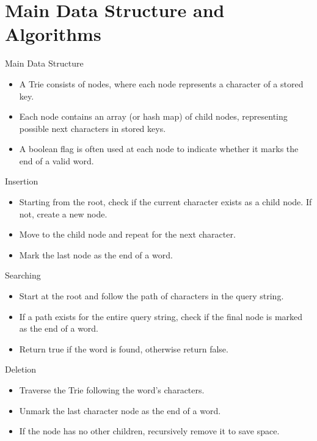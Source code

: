 \section{Main Data Structure and Algorithms}

\begin{frame}{Main Data Structure}
    \begin{itemize}[label=$\star$]
    \item A Trie consists of nodes, where each node represents a character of a stored key.
    \item Each node contains an array (or hash map) of child nodes, representing possible next characters in stored keys.
    \item A boolean flag is often used at each node to indicate whether it marks the end of a valid word.
\end{itemize}
\end{frame}

\begin{frame}{Insertion}
    \begin{itemize}[label=$\star$]
    \item Starting from the root, check if the current character exists as a child node. If not, create a new node. 
    \item Move to the child node and repeat for the next character.
    \item Mark the last node as the end of a word.
\end{itemize}
\end{frame}
\begin{frame}{Searching}
    \begin{itemize}[label=$\star$]
    \item Start at the root and follow the path of characters in the query string.
    \item If a path exists for the entire query string, check if the final node is marked as the end of a word.
    \item Return true if the word is found, otherwise return false.
\end{itemize}
\end{frame}
\begin{frame}{Deletion}
    \begin{itemize}[label=$\star$]
    \item Traverse the Trie following the word's characters.
    \item Unmark the last character node as the end of a word.
    \item If the node has no other children, recursively remove it to save space.
\end{itemize}
\end{frame}
